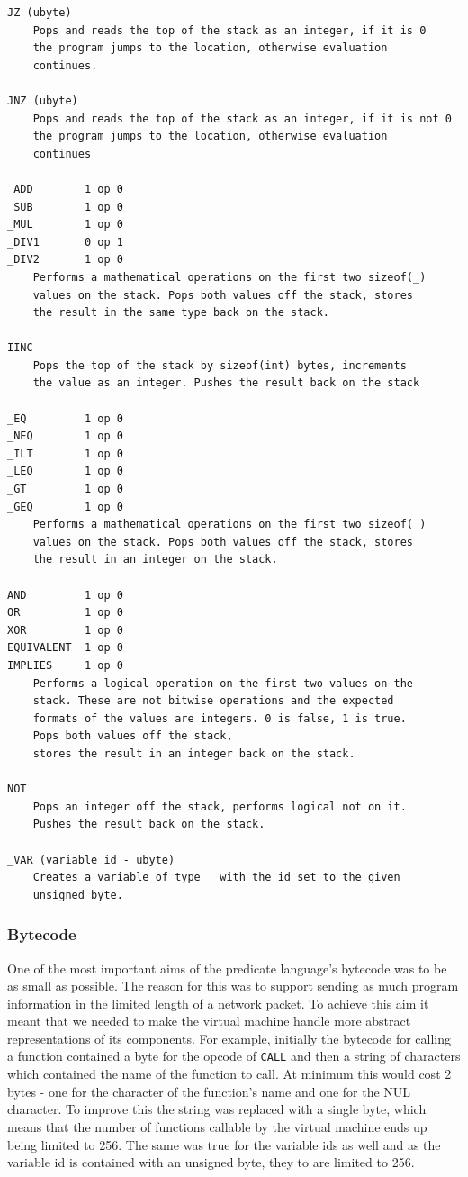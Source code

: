 \begin{verbatim}
JZ (ubyte)
    Pops and reads the top of the stack as an integer, if it is 0
    the program jumps to the location, otherwise evaluation
    continues.

JNZ (ubyte)
    Pops and reads the top of the stack as an integer, if it is not 0
    the program jumps to the location, otherwise evaluation
    continues

_ADD        1 op 0
_SUB        1 op 0
_MUL        1 op 0
_DIV1       0 op 1
_DIV2       1 op 0
    Performs a mathematical operations on the first two sizeof(_)
    values on the stack. Pops both values off the stack, stores
    the result in the same type back on the stack.

IINC
    Pops the top of the stack by sizeof(int) bytes, increments
    the value as an integer. Pushes the result back on the stack

_EQ	        1 op 0
_NEQ        1 op 0
_ILT        1 op 0
_LEQ        1 op 0
_GT	        1 op 0
_GEQ        1 op 0
    Performs a mathematical operations on the first two sizeof(_)
    values on the stack. Pops both values off the stack, stores
    the result in an integer on the stack.

AND         1 op 0
OR          1 op 0
XOR	        1 op 0
EQUIVALENT  1 op 0
IMPLIES     1 op 0
    Performs a logical operation on the first two values on the
    stack. These are not bitwise operations and the expected
    formats of the values are integers. 0 is false, 1 is true.
    Pops both values off the stack,
    stores the result in an integer back on the stack.

NOT
    Pops an integer off the stack, performs logical not on it.
    Pushes the result back on the stack.
	
_VAR (variable id - ubyte)
    Creates a variable of type _ with the id set to the given
    unsigned byte.
\end{verbatim}


\subsubsection{Bytecode}

One of the most important aims of the predicate language's bytecode was to be as small as possible. The reason for this was to support sending as much program information in the limited length of a network packet. To achieve this aim it meant that we needed to make the virtual machine handle more abstract representations of its components. For example, initially the bytecode for calling a function contained a byte for the opcode of \verb|CALL| and then a string of characters which contained the name of the function to call. At minimum this would cost 2 bytes - one for the character of the function's name and one for the NUL character. To improve this the string was replaced with a single byte, which means that the number of functions callable by the virtual machine ends up being limited to 256. The same was true for the variable ids as well and as the variable id is contained with an unsigned byte, they to are limited to 256.


